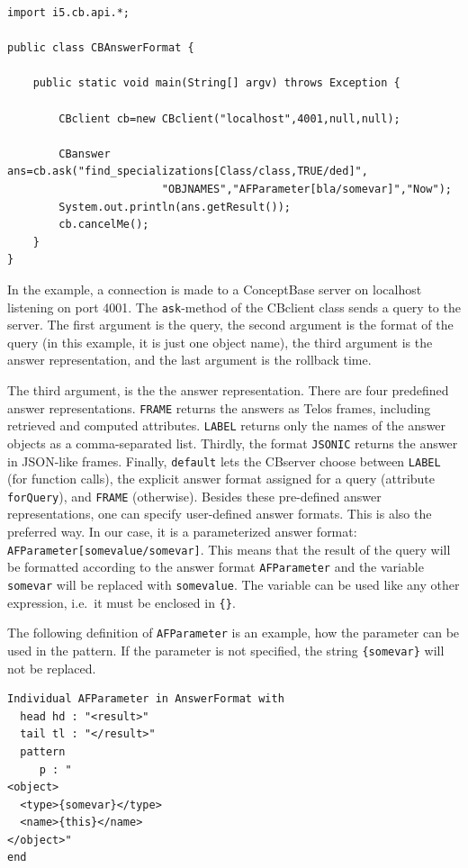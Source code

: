 {\small
\begin{verbatim}
import i5.cb.api.*;

public class CBAnswerFormat {

    public static void main(String[] argv) throws Exception {

        CBclient cb=new CBclient("localhost",4001,null,null);

        CBanswer ans=cb.ask("find_specializations[Class/class,TRUE/ded]",
                        "OBJNAMES","AFParameter[bla/somevar]","Now");
        System.out.println(ans.getResult());
        cb.cancelMe();
    }
}
\end{verbatim}
}

In the example, a connection is made to a ConceptBase server on localhost listening on port 4001.
The {\tt ask}-method of the CBclient class sends a query to the server. The first argument
is the query, the second argument is the format of the query (in this example, it is just one object name),
the third argument is the answer representation, and the last argument is the rollback time.

The third argument, is the the answer representation.
There are four predefined answer representations. {\tt FRAME} returns the answers as
Telos frames, including retrieved and computed attributes. {\tt LABEL} returns only
the names of the answer objects as a comma-separated list. Thirdly, the format 
{\tt JSONIC} returns the answer in JSON-like frames.
Finally, {\tt default}
lets the CBserver choose between {\tt LABEL}  (for function calls), the explicit answer format assigned for
a query (attribute {\tt forQuery}),
and {\tt FRAME} (otherwise). Besides these pre-defined answer representations, one can specify
user-defined answer formats. This is also the preferred way.
In our case, it is a parameterized answer format: \verb+AFParameter[somevalue/somevar]+.
This means that the result of the query will be formatted according to
the answer format {\tt AFParameter} and the variable {\tt somevar}
will be replaced with {\tt somevalue}. The variable can be used like any other
expression, i.e.\ it must be enclosed in \verb+{}+.

The following definition of {\tt AFParameter} is an example, how
the parameter can be used in the pattern. If the parameter is not
specified, the string \verb+{somevar}+ will not be replaced.

{\small
\begin{verbatim}
Individual AFParameter in AnswerFormat with
  head hd : "<result>"
  tail tl : "</result>"
  pattern
     p : "
<object>
  <type>{somevar}</type>
  <name>{this}</name>
</object>"
end
\end{verbatim}
}

